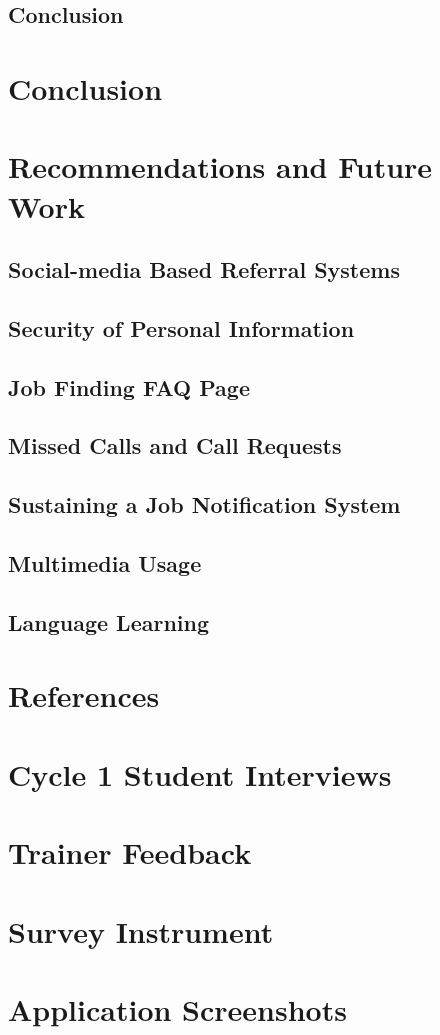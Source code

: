 \documentclass[12pt,a4paper]{report}
\begin{document}
\section{Conclusion}

\chapter{Conclusion}

\chapter{Recommendations and Future Work}
\section{Social-media Based Referral Systems}
\section{Security of Personal Information}
\section{Job Finding FAQ Page}
\section{Missed Calls and Call Requests}
\section{Sustaining a Job Notification System}
\section{Multimedia Usage}
\section{Language Learning}

\chapter{References}

% 
% 

\appendix
\chapter{Cycle 1 Student Interviews}
\chapter{Trainer Feedback}
\chapter{Survey Instrument}
\chapter{Application Screenshots}

\end{document}

